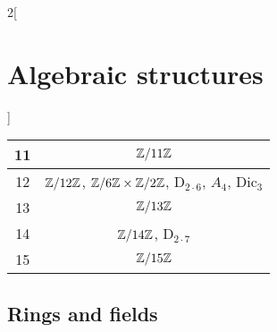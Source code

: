 \documentclass[../../../main.tex]{subfiles}
\begin{document}
\begin{multicols}{2}[\section{Algebraic structures}]
\begin{center}
\begin{tabular}{|c|c|}
            \hline
            11    & $\quot{\ZZ}{11\ZZ}$                                                                                                                  \\
            \hline
            12    & $\quot{\ZZ}{12\ZZ}$, $\quot{\ZZ}{6\ZZ}\times\quot{\ZZ}{2\ZZ}$, $\text{D}_{2\cdot 6}$, $A_4$, $\text{Dic}_3$                          \\
            \hline
            13    & $\quot{\ZZ}{13\ZZ}$                                                                                                                  \\
            \hline
            14    & $\quot{\ZZ}{14\ZZ}$, $\text{D}_{2\cdot 7}$                                                                                           \\
            \hline
            15    & $\quot{\ZZ}{15\ZZ}$                                                                                                                  \\
            \hline
        \end{tabular}
    \end{center}
    \subsection{Rings and fields}\label{AS-R}

\end{multicols}
\end{document}
